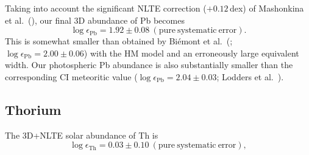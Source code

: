 \documentclass[traditabstract]{aa}
\begin{document}
Taking into account the significant NLTE correction ($+0.12$\,dex) of Mashonkina et al.\ (\cite{mash12}), our final 3D abundance of Pb becomes
\begin{displaymath}
\log\epsilon_{\mathrm{Pb}}=1.92\pm0.08\ \mathrm{(pure\ systematic\ error)}.
\end{displaymath}
This is somewhat smaller than obtained by Bi\'emont et al.\ (\cite{biem6};  $\log\epsilon_{\mathrm{Pb}}=2.00\pm0.06$) with the HM model and an erroneously large equivalent width. Our photospheric Pb abundance is also substantially smaller than the corresponding CI meteoritic value ($\log \epsilon_{\mathrm{Pb}}=2.04\pm0.03$; Lodders et al.\ \cite{lodd}).  

\subsection{Thorium}
The 3D+NLTE solar abundance of Th is
\begin{displaymath}
\log\epsilon_{\mathrm{Th}}=0.03\pm0.10\ \mathrm{(pure\ systematic\ error)},
\end{displaymath}
\end{document}
